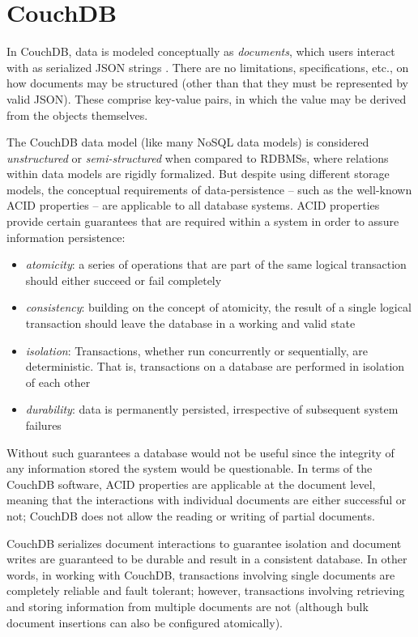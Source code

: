 \section{CouchDB}
In CouchDB, data is modeled conceptually as \textit{documents}, which users interact with as serialized JSON strings \cite{rfc7159}. There are no limitations, specifications, etc., on how documents may be structured (other than that they must be represented by valid JSON). These comprise key-value pairs, in which the value may be derived from the objects themselves.

The CouchDB data model (like many NoSQL data models) is considered \textit{unstructured} or \textit{semi-structured} when compared to RDBMSs, where relations within data models are rigidly formalized. But despite using different storage models, the conceptual requirements of data-persistence – such as the well-known ACID properties – are applicable to all database systems. ACID properties provide certain guarantees that are required within a system in order to assure information persistence:

\begin{itemize}
    \item \textit{atomicity}: a series of operations that are part of the same logical transaction should either succeed or fail completely
    \item \textit{consistency}: building on the concept of atomicity, the result of a single logical transaction should leave the database in a working and valid state
    \item \textit{isolation}: Transactions, whether run concurrently or sequentially, are deterministic. That is, transactions on a database are performed in isolation of each other
    \item \textit{durability}: data is permanently persisted, irrespective of subsequent system failures
\end{itemize}

Without such guarantees a database would not be useful since the integrity of any information stored the system would be questionable. In terms of the CouchDB software, ACID properties are applicable at the document level, meaning that the interactions with individual documents are either successful or not; CouchDB does not allow the reading or writing of partial documents.

CouchDB serializes document interactions to guarantee isolation and document writes are guaranteed to be durable and result in a consistent database. In other words, in working with CouchDB, transactions involving single documents are completely reliable and fault tolerant; however, transactions involving retrieving and storing information from multiple documents are not (although bulk document insertions can also be configured atomically).

